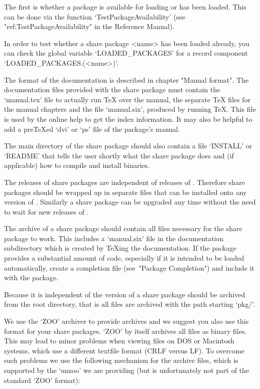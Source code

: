 The first is whether a package is available for loading or has been loaded.
This can be done via the function `TestPackageAvailability' (see
"ref:TestPackageAvailability" in the Reference Manual). 

In order to test whether a share package <name> has been loaded already, you
can check the global variable `LOADED_PACKAGES' for a record component
`LOADED_PACKAGES.(<name>)'.


The format of the documentation is described in chapter "Manual format". The
documentation files provided with the share package must contain the
`manual.tex' file to actually run {\TeX} over the manual, the separate
{\TeX} files for the manual chapters and the file `manual.six', produced by
running {\TeX}. This file is used by the online help to get the index
information. It may also be helpful to add a pre{\TeX}ed `dvi' or `ps' file
of the package's manual.

The main directory of the share package should also contain a file `INSTALL'
or `README' that tells the user shortly what the share package does and (if
applicable) how to compile and install binaries.


The releases of share packages are independent of releases of {\GAP}.
Therefore share packages should be wrapped up in separate files that can be
installed onto any version of {\GAP}. Similarly a share package can be
upgraded any time without the need to wait for new releases of {\GAP}.

The archive of a share package should contain all files necessary for the
share package to work. This includes a `manual.six' file in the
documentation subdirectory which is created by {\TeX}ing the documentation.
If the package provides a substantial amount of code,
especially if it is intended to be loaded automatically, create a completion
file (see~"Package Completion") and include it with the package.

Because it is independent of the version of {\GAP} a share package should be
archived from the {\GAP} root directory, that is all files are archived with
the path starting `pkg/'.

We use the `ZOO' archiver to provide {\GAP} archives and we suggest you also
use this format for your share packages. `ZOO' by itself archives all files
as binary files. This may lead to minor problems when viewing files on DOS
or Macintosh systems, which use a different textfile format (CRLF versus
LF). To overcome such problems we use the following mechanism for the {\GAP}
archive files, which is supported by the `unzoo' we are providing (but is
unfortunately not part of the standard `ZOO' format):


